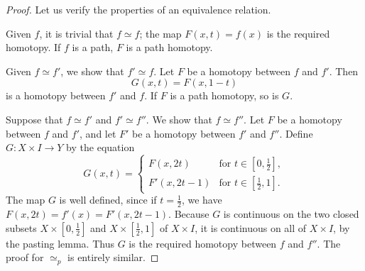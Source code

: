 \documentclass{article}
\begin{document}
\begin{proof}
Let us verify the properties of an equivalence relation.

Given $f$, it is trivial that $f \simeq f$; the map $F(x, t) = f(x)$ is the required homotopy. If $f$ is a path, $F$ is a path homotopy.

Given $f \simeq f'$, we show that $f' \simeq f$. Let $F$ be a homotopy between $f$ and $f'$. Then
\[
G(x, t) = F(x, 1 - t)
\]
is a homotopy between $f'$ and $f$. If $F$ is a path homotopy, so is $G$.

Suppose that $f \simeq f'$ and $f' \simeq f''$. We show that $f \simeq f''$. Let $F$ be a homotopy between $f$ and $f'$, and let $F'$ be a homotopy between $f'$ and $f''$. Define $G : X \times I \to Y$ by the equation
\[
G(x, t) =
\begin{cases}
F(x, 2t) & \text{for } t \in \left[0, \frac{1}{2}\right], \\
F'(x, 2t - 1) & \text{for } t \in \left[\frac{1}{2}, 1\right].
\end{cases}
\]
The map $G$ is well defined, since if $t = \frac{1}{2}$, we have $F(x, 2t) = f'(x) = F'(x, 2t - 1)$. Because $G$ is continuous on the two closed subsets $X \times \left[0, \frac{1}{2}\right]$ and $X \times \left[\frac{1}{2}, 1\right]$ of $X \times I$, it is continuous on all of $X \times I$, by the pasting lemma. Thus $G$ is the required homotopy between $f$ and $f''$. The proof for $\simeq_p$ is entirely similar.
\end{proof}
\end{document}
